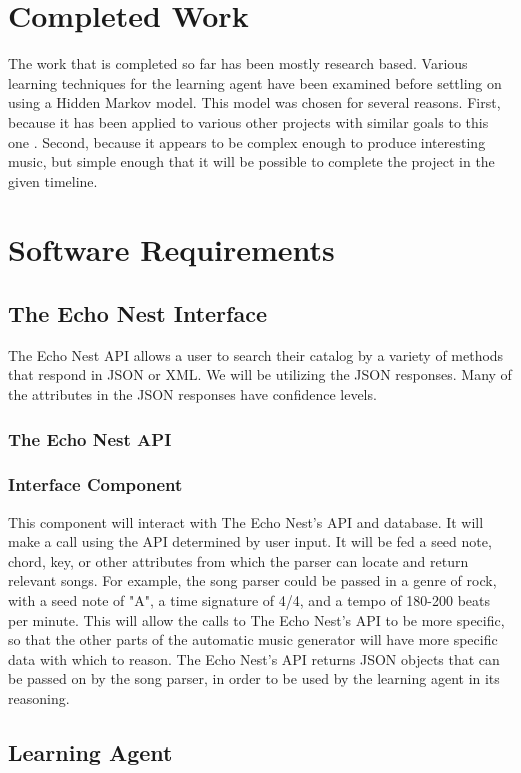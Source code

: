 \documentclass{article}
\begin{document}
\section{Completed Work}
The work that is completed so far has been mostly research based. Various learning techniques for the learning agent have been examined before settling on using a Hidden Markov model. This model was chosen for several reasons. First, because it has been applied to various other projects with similar goals to this one \cite{761266, 1394661} . Second, because it appears to be complex enough to produce interesting music, but simple enough that it will be possible to complete the project in the given timeline.\\

\section{Software Requirements}
\subsection{The Echo Nest Interface}
The Echo Nest API allows a user to search their catalog by a variety of methods that respond in JSON or XML.  We will be utilizing the JSON responses.  Many of the attributes in the JSON responses have confidence levels. 
\subsubsection{The Echo Nest API}
\subsubsection{Interface Component}
This component will interact with The Echo Nest's API and database. It will make a call using the API determined by user input. It will be fed a seed note, chord, key, or other attributes from which the parser can locate and return relevant songs. For example, the song parser could be passed in a genre of rock, with a seed note of "A", a time signature of 4/4, and a tempo of 180-200 beats per minute. This will allow the calls to The Echo Nest's API to be more specific, so that the other parts of the automatic music generator will have more specific data with which to reason. The Echo Nest's API returns JSON objects that can be passed on by the song parser, in order to be used by the learning agent in its reasoning.

\subsection{Learning Agent}
\end{document}

